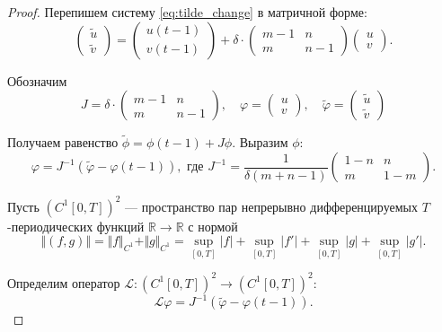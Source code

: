 \begin{proof}
	Перепишем систему \eqref{eq:tilde_change} в матричной форме:
	\[
	\begin{pmatrix}
		\tilde{u}\\
		\tilde{v}
	\end{pmatrix} = 
	\begin{pmatrix}
		u(t - 1)\\
		v(t - 1)
	\end{pmatrix} +
	\delta \cdot
	\begin{pmatrix}
		m - 1 & n \\
		m & n - 1
	\end{pmatrix}
	\begin{pmatrix}
		u\\
		v
	\end{pmatrix}.
	\]
	
	Обозначим
	\[
	J = 
	\delta \cdot
	\begin{pmatrix}
		m - 1 & n \\
		m & n - 1
	\end{pmatrix}, \quad
	\varphi =
	\begin{pmatrix}
		u\\
		v
	\end{pmatrix}, \quad
	\tilde{\varphi} =
	\begin{pmatrix}
		\tilde{u}\\
		\tilde{v}
	\end{pmatrix}
	\]
	
	Получаем равенство $\tilde{\phi} = \phi(t - 1) + J \phi$. Выразим $\phi$:
	\begin{equation}
		\label{eq:tilde_matrix_form}
		\varphi = 
		J^{-1}
		\left(
		\tilde{\varphi} -
		\varphi(t - 1)
		\right),
		\text{ где }
		J^{-1} = \dfrac{1}{\delta(m + n - 1)} 
		\begin{pmatrix}
			1 - n & n \\
			m & 1 - m
		\end{pmatrix}.
	\end{equation}
	
	Пусть $(C^1[0, T])^2$ --- пространство пар непрерывно дифференцируемых $T$-периодических функций $\mathbb{R} \to \mathbb{R}$ с нормой
	\[\Vert (f, g) \Vert = \Vert f \Vert_{C^1} + \Vert g \Vert_{C^1} = \sup\limits_{[0, T]} |f| + \sup\limits_{[0, T]} |f'| + \sup\limits_{[0, T]} |g| + \sup\limits_{[0, T]} |g'|.\]
	
	Определим оператор $\mathcal{L}:(C^1[0, T])^2 \to (C^1[0, T])^2$:
	\[\mathcal{L}\varphi = J^{-1} \left(\tilde{\varphi} - \varphi(t - 1) \right).\]
	

\end{proof}
